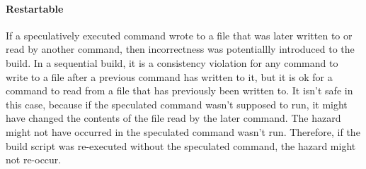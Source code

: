 \paragraph{Restartable} %
If a speculatively executed command wrote to a file that was later written to or read by another command, then incorrectness was potentiallly introduced to the build.  In a sequential build, it is a
consistency violation for any command to write to a file after a previous command has written to it, but it is ok for a command to read from a file that has previously been written to.  It isn't safe in this case, because if the speculated command wasn't supposed to run, it might have changed the contents of the file read by the later command.
The hazard might not have occurred in the speculated command wasn't run.  Therefore, if the build script was re-executed without the speculated command, the hazard might not re-occur.


